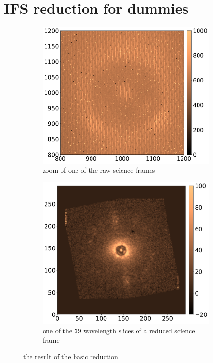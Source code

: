 \documentclass[twoside,single,12pt]{lion-msc}
\begin{document}
\section{IFS reduction for dummies}
\begin{figure}[!b]
\centering
\begin{subfigure}{.48\textwidth}
  \centering
  \includegraphics[width=1\linewidth]{rawframe}
  \caption{zoom of one of the raw science frames\\}
  \label{fig:rawdata}
\end{subfigure}\hfill
\begin{subfigure}{.47\textwidth}
  \centering
  \includegraphics[width=1\linewidth]{reducedframe}
  \caption{one of the 39 wavelength slices of a reduced science frame}
  \label{fig:reduceddata}
\end{subfigure}
\caption{the result of the basic reduction}
\label{fig:datareduction}
\end{figure}
\end{document}
